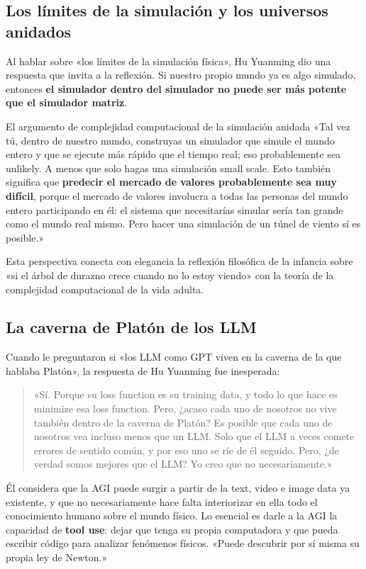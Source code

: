 \documentclass[a4paper]{article}
\begin{document}
\subsection{Los límites de la simulación y los universos anidados}

Al hablar sobre «los límites de la simulación física», Hu Yuanming dio una respuesta que invita a la reflexión. Si nuestro propio mundo ya es algo simulado, entonces \textbf{el simulador dentro del simulador no puede ser más potente que el simulador matriz}.

\begin{knowledgebox}{El argumento de complejidad computacional de la simulación anidada}
«Tal vez tú, dentro de nuestro mundo, construyas un simulador que simule el mundo entero y que se ejecute más rápido que el tiempo real; eso probablemente sea unlikely. A menos que solo hagas una simulación small scale. Esto también significa que \textbf{predecir el mercado de valores probablemente sea muy difícil}, porque el mercado de valores involucra a todas las personas del mundo entero participando en él: el sistema que necesitarías simular sería tan grande como el mundo real mismo. Pero hacer una simulación de un túnel de viento sí es posible.»
\end{knowledgebox}

Esta perspectiva conecta con elegancia la reflexión filosófica de la infancia sobre «si el árbol de durazno crece cuando no lo estoy viendo» con la teoría de la complejidad computacional de la vida adulta.

\subsection{La caverna de Platón de los LLM}

Cuando le preguntaron si «los LLM como GPT viven en la caverna de la que hablaba Platón», la respuesta de Hu Yuanming fue inesperada:

\begin{quote}
«Sí. Porque su loss function es su training data, y todo lo que hace es minimize esa loss function. Pero, ¿acaso cada uno de nosotros no vive también dentro de la caverna de Platón? Es posible que cada uno de nosotros vea incluso menos que un LLM. Solo que el LLM a veces comete errores de sentido común, y por eso uno se ríe de él seguido. Pero, ¿de verdad somos mejores que el LLM? Yo creo que no necesariamente.»
\end{quote}

Él considera que la AGI puede surgir a partir de la text, video e image data ya existente, y que no necesariamente hace falta interiorizar en ella todo el conocimiento humano sobre el mundo físico. Lo esencial es darle a la AGI la capacidad de \textbf{tool use}: dejar que tenga su propia computadora y que pueda escribir código para analizar fenómenos físicos. «Puede descubrir por sí misma su propia ley de Newton.»
\end{document}
